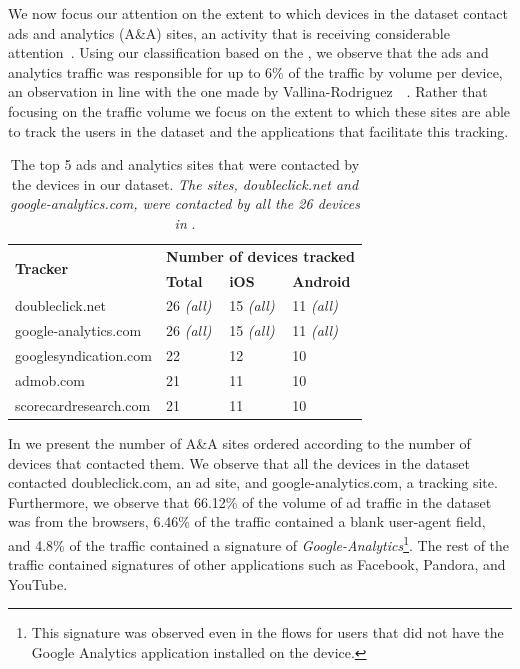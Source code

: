 We now focus our attention on the extent to which devices in the
\mobWild dataset contact ads and analytics (A\&A) sites, an activity
that is receiving considerable
attention~\cite{roesner:webtrackers,leontiadis:mobileads,vallina-rod:ads}.
Using our classification based on the \httphost, we observe that the
ads and analytics traffic was responsible for up to 6\% of the traffic
by volume per device, an observation in line with the one made by
Vallina-Rodriguez~\etal~\cite{vallina-rod:ads}.  Rather that focusing
on the traffic volume we focus on the extent to which these sites are
able to track the users in the dataset and the applications that
facilitate this tracking.

\begin{table}
\centering
\begin{small}
\begin{tabular}{|p{}|p{}|p{}|p{}|}
\hline
\multirow{2}{*}{\bf Tracker} & \multicolumn{3}{c|}{\bf Number of devices tracked}\tabularnewline
\cline{2-4}
                      &  {\bf Total} & {\bf iOS} & {\bf Android} \tabularnewline
\hline
doubleclick.net       & 26 {\em(all)} & 15 {\em(all)} & 11 {\em(all)} \tabularnewline
\hline
google-analytics.com  & 26 {\em(all)} & 15 {\em(all)}  & 11 {\em(all)} \tabularnewline
\hline
googlesyndication.com & 22 & 12 & 10 \tabularnewline
\hline
admob.com             & 21 & 11 & 10 \tabularnewline
\hline
scorecardresearch.com &  21 & 11 & 10 \tabularnewline
\hline
\end{tabular}
\end{small}
\caption{The top 5 ads and analytics sites that were contacted by the devices in our dataset.
\emph{The sites, doubleclick.net and google-analytics.com, were contacted by all the 26 devices in} \mobWild.}
\label{tab:top-trackers}
\end{table}

In  we present the number of A\&A sites ordered
according to the number of devices that contacted them.  We observe
that all the devices in the \mobWild dataset contacted
doubleclick.com, an ad site, and google-analytics.com, a tracking
site.  Furthermore, we observe that 66.12\% of the volume of ad
traffic in the \mobWild dataset was from the browsers, 6.46\% of the
traffic contained a blank user-agent field, and 4.8\% of the traffic
contained a signature of \emph{Google-Analytics}\footnote{This
  signature was observed even in the flows for users that did not have
  the Google Analytics application installed on the device.}.  The
rest of the traffic contained signatures of other applications such as
Facebook, Pandora, and YouTube.

